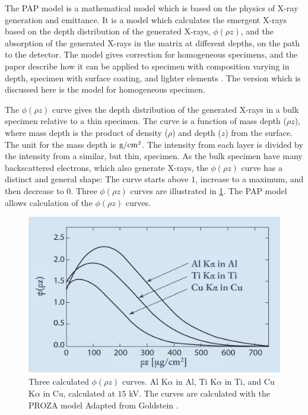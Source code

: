 The PAP model is a mathematical model which is based on the physics of X-ray generation and emittance.
It is a model which calculates the emergent X-rays based on the depth distribution of the generated X-rays, $\phi(\rho z)$, and the absorption of the generated X-rays in the matrix at different depths, on the path to the detector.
The model gives correction for homogeneous specimens, and the paper describe how it can be applied to specimen with composition varying in depth, specimen with surface coating, and lighter elements \cite{pap_1991}.
The version which is discussed here is the model for homogeneous specimen.



The $\phi(\rho z)$ curve gives the depth distribution of the generated X-rays in a bulk specimen relative to a thin specimen.
The curve is a function of mass depth ($\rho z$), where mass depth is the product of density ($\rho$) and depth ($z$) from the surface.
The unit for the mass depth is $\textnormal{g}/\textnormal{cm}^2$.
The intensity from each layer is divided by the intensity from a similar, but thin, specimen.
As the bulk specimen have many backscattered electrons, which also generate X-rays, the $\phi(\rho z)$ curve has a distinct and general shape:
The curve starts above $1$, increase to a maximum, and then decrease to $0$.
Three $\phi(\rho z)$ curves are illustrated in \cref{fig:theory:quantification:phi_rho_z_curves}.
The PAP model allows calculation of the $\phi(\rho z)$ curves.




\begin{figure}[htbp]
    \centering
    \includegraphics[width=0.65\linewidth]{figures/phi_rho_z_curves__goldstein.png}
    \caption{
        Three calculated $\phi(\rho z)$ curves.
        Al K$\alpha$ in Al, Ti K$\alpha$ in Ti, and Cu K$\alpha$ in Cu, calculated at $15$ kV.
        The curves are calculated with the PROZA model \cite{bastin_proza_1988}
        Adapted from Goldstein \cite[Fig. 19.9]{goldstein_scanning_2018}.
    }
    \label{fig:theory:quantification:phi_rho_z_curves}
\end{figure}


